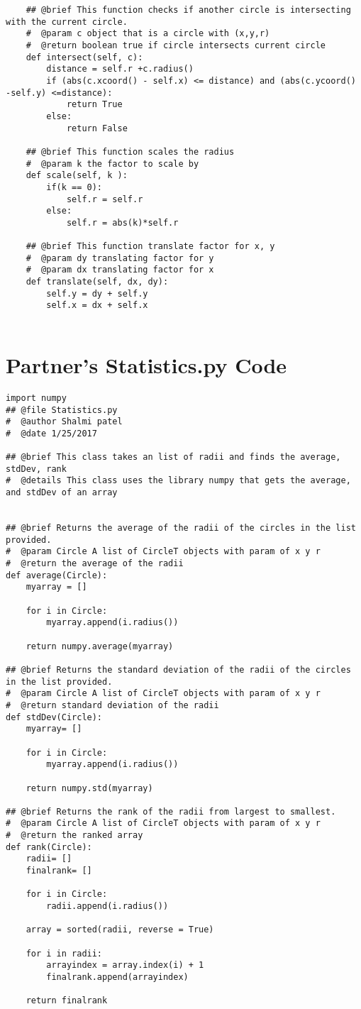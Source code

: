 \documentclass[12pt]{article}
\begin{document}
\begin{lstlisting}
    ## @brief This function checks if another circle is intersecting with the current circle.
    #  @param c object that is a circle with (x,y,r)
    #  @return boolean true if circle intersects current circle 
    def intersect(self, c):
        distance = self.r +c.radius()
        if (abs(c.xcoord() - self.x) <= distance) and (abs(c.ycoord() -self.y) <=distance):
            return True
        else:
            return False
        
    ## @brief This function scales the radius
    #  @param k the factor to scale by
    def scale(self, k ):
        if(k == 0):
            self.r = self.r
        else:
            self.r = abs(k)*self.r
            
    ## @brief This function translate factor for x, y
    #  @param dy translating factor for y
    #  @param dx translating factor for x
    def translate(self, dx, dy):
        self.y = dy + self.y
        self.x = dx + self.x
        
\end{lstlisting}

\newpage

\section{Partner's Statistics.py Code} \label{PartnerStatsSect}
\begin{lstlisting}
import numpy
## @file Statistics.py
#  @author Shalmi patel
#  @date 1/25/2017

## @brief This class takes an list of radii and finds the average, stdDev, rank
#  @details This class uses the library numpy that gets the average, and stdDev of an array


## @brief Returns the average of the radii of the circles in the list provided.
#  @param Circle A list of CircleT objects with param of x y r
#  @return the average of the radii
def average(Circle):
    myarray = []

    for i in Circle:
        myarray.append(i.radius())

    return numpy.average(myarray)

## @brief Returns the standard deviation of the radii of the circles in the list provided.
#  @param Circle A list of CircleT objects with param of x y r
#  @return standard deviation of the radii
def stdDev(Circle):
    myarray= []

    for i in Circle:
        myarray.append(i.radius())

    return numpy.std(myarray)

## @brief Returns the rank of the radii from largest to smallest.
#  @param Circle A list of CircleT objects with param of x y r 
#  @return the ranked array
def rank(Circle):
    radii= []
    finalrank= []

    for i in Circle:
        radii.append(i.radius())

    array = sorted(radii, reverse = True)
    
    for i in radii:
        arrayindex = array.index(i) + 1
        finalrank.append(arrayindex)

    return finalrank

\end{lstlisting}
\end{document}
